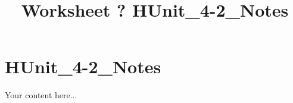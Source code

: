 \documentclass{article}
\title{Worksheet ? HUnit_4-2_Notes}
\begin{document}
\maketitle
\section*{HUnit_4-2_Notes}
Your content here...\\
\end{document}

